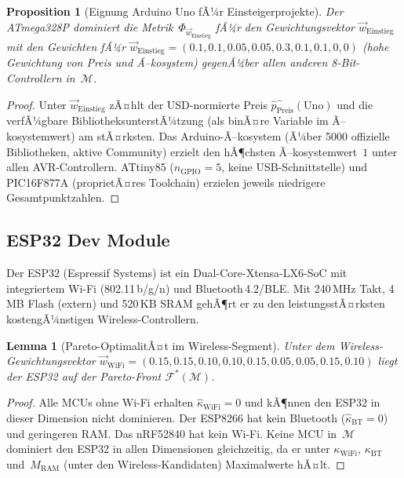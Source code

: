 ﻿\documentclass[12pt, a4paper]{article}
\theoremstyle{plain}
\newtheorem{lemma}[theorem]{Lemma}
\newtheorem{proposition}[theorem]{Proposition}
\theoremstyle{definition}
\theoremstyle{remark}
\begin{document}
\begin{proposition}[Eignung Arduino Uno fÃ¼r Einsteigerprojekte]
\label{prop:arduino}
  Der ATmega328P dominiert die Metrik~$\Phi_{\vec{w}_\text{Einstieg}}$
  fÃ¼r den Gewichtungsvektor
  $\vec{w}_\text{Einstieg}$ mit den Gewichten fÃ¼r $\vec{w}_\text{Einstieg} = (0.1, 0.1, 0.05, 0.05, 0.3, 0.1, 0.1, 0, 0)$
  (hohe Gewichtung von Preis und Ã–kosystem) gegenÃ¼ber allen anderen
  8-Bit-Controllern in~$\mathcal{M}$.
\end{proposition}

\begin{proof}
  Unter $\vec{w}_\text{Einstieg}$ zÃ¤hlt der USD-normierte Preis
  $\hat{p}_\text{Preis}^{-}(\text{Uno})$ und die verfÃ¼gbare
  BibliotheksunterstÃ¼tzung (als binÃ¤re Variable im Ã–kosystemwert) am stÃ¤rksten.
  Das Arduino-Ã–kosystem (Ã¼ber 5000 offizielle Bibliotheken, aktive Community)
  erzielt den hÃ¶chsten Ã–kosystemwert~$1$ unter allen AVR-Controllern.
  ATtiny85 ($n_\text{GPIO}=5$, keine USB-Schnitt\-stelle) und PIC16F877A
  (proprietÃ¤res Toolchain) erzielen jeweils niedrigere Gesamtpunktzahlen.
 
\end{proof}

\subsection{ESP32 Dev Module}

Der ESP32 (Espressif Systems) ist ein Dual-Core-Xtensa-LX6-SoC mit integriertem
Wi-Fi (802.11\,b/g/n) und Bluetooth\,4.2/BLE.
Mit 240\,MHz Takt, 4\,MB Flash (extern) und 520\,KB SRAM gehÃ¶rt er zu den
leistungsstÃ¤rksten kostengÃ¼nstigen Wireless-Controllern.

\begin{lemma}[Pareto-OptimalitÃ¤t im Wireless-Segment]
\label{lem:esp32_pareto}
  Unter dem Wireless-Gewicht\-ungsvektor
  $\vec{w}_\text{WiFi} = (0.15, 0.15, 0.10, 0.10, 0.15, 0.05, 0.05, 0.15, 0.10)$
  liegt der ESP32 auf der Pareto-Front $\mathcal{F}^*(\mathcal{M})$.
\end{lemma}

\begin{proof}
  Alle MCUs ohne Wi-Fi erhalten $\hat{\kappa}_\text{WiFi} = 0$ und kÃ¶nnen
  den ESP32 in dieser Dimension nicht dominieren.
  Der ESP8266 hat kein Bluetooth ($\hat{\kappa}_\text{BT}=0$) und geringeren RAM.
  Das nRF52840 hat kein Wi-Fi.
  Keine MCU in~$\mathcal{M}$ dominiert den ESP32 in allen Dimensionen
  gleichzeitig, da er unter $\kappa_\text{WiFi}$, $\kappa_\text{BT}$
  und~$M_\text{RAM}$ (unter den Wireless-Kandidaten) Maximalwerte hÃ¤lt.
 
\end{proof}
\end{document}

